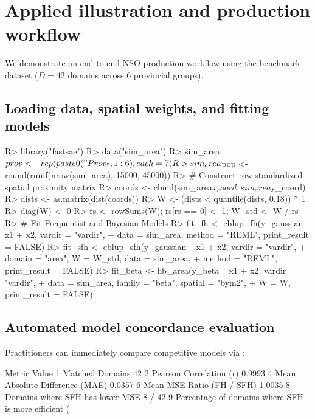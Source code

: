 \documentclass[article]{jss}
\begin{document}
\section{Applied illustration and production workflow} \label{sec:applications}

We demonstrate an end-to-end NSO production workflow using the benchmark dataset  ($D = 42$ domains across 6 provincial groups).

\subsection{Loading data, spatial weights, and fitting models}
\begin{Schunk}
\begin{Sinput}
R> library("fastsae")
R> data("sim_area")
R> sim_area$prov <- rep(paste0("Prov_", 1:6), each = 7)
R> sim_area$pop <- round(runif(nrow(sim_area), 15000, 45000))
R> # Construct row-standardized spatial proximity matrix
R> coords <- cbind(sim_area$x_coord, sim_area$y_coord)
R> dists <- as.matrix(dist(coords))
R> W <- (dists < quantile(dists, 0.18)) * 1
R> diag(W) <- 0
R> rs <- rowSums(W); rs[rs == 0] <- 1; W_std <- W / rs
R> # Fit Frequentist and Bayesian Models
R> fit_fh <- eblup_fh(y_gaussian ~ x1 + x2, vardir = "vardir",
+    data = sim_area, method = "REML", print_result = FALSE)
R> fit_sfh <- eblup_sfh(y_gaussian ~ x1 + x2, vardir = "vardir",
+    domain = "area", W = W_std, data = sim_area,
+    method = "REML", print_result = FALSE)
R> fit_beta <- hb_area(y_beta ~ x1 + x2, vardir = "vardir",
+    data = sim_area, family = "beta", spatial = "bym2",
+    W = W, print_result = FALSE)
\end{Sinput}
\end{Schunk}

\subsection{Automated model concordance evaluation}
Practitioners can immediately compare competitive models via :
\begin{Schunk}
\begin{Soutput}
                                                 Metric  Value
1                                       Matched Domains     42
2                               Pearson Correlation (r) 0.9993
4                        Mean Absolute Difference (MAE) 0.0357
6                             Mean MSE Ratio (FH / SFH) 1.0035
8                       Domains where SFH has lower MSE 8 / 42
9 Percentage of domains where SFH is more efficient (%
\end{Soutput}
\end{Schunk}
\end{document}

